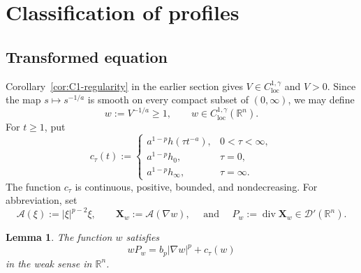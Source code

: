\documentclass[reqno,12pt]{amsart}
\numberwithin{equation}{section}
\newtheorem{lem}[thm]{Lemma}
\theoremstyle{remark}
\newcommand{\R}{\mathbb R}
\newcommand{\loc}{\mathrm{loc}}
\newcommand{\Acal}{\mathcal A}
\newcommand{\Xbf}{\mathbf X}
\begin{document}
\section{Classification of profiles}

\subsection{Transformed equation}\label{sec:classification-start}

Corollary~\ref{cor:C1-regularity} in the earlier section gives
$V\in C^{1,\gamma}_{\loc}$ and $V>0$.  Since the map $s\mapsto s^{-1/a}$ is smooth on every compact
subset of $(0,\infty)$, we may define
\begin{equation}\label{eq:defn-w}
w:=V^{-1/a}\ge1, \qquad w\in C^{1,\gamma}_{\loc}(\R^n).
\end{equation}
For $t\ge1$, put
\begin{equation}\label{eq:c-tau}
 c_\tau(t):=
 \begin{cases}
a^{1-p}h(\tau t^{-a}),&0<\tau<\infty,\\
a^{1-p}h_0,&\tau=0,\\
a^{1-p}h_\infty,&\tau=\infty.
 \end{cases}
\end{equation}
The function $c_\tau$ is continuous, positive, bounded, and nondecreasing.
For abbreviation, set
\begin{equation}\label{eq:defn-Pw}
\Acal(\xi):=|\xi|^{p-2}\xi,
\qquad \Xbf_w:=\Acal(\nabla w),
\quad \text{ and } \quad  P_w:=\operatorname{div}\Xbf_w\in\mathcal D'(\R^n).
\end{equation}

\begin{lem}
The function $w$ satisfies
\begin{equation}\label{eq:transformed-equation}
wP_w=b_p|\nabla w|^p+c_\tau(w)
\end{equation}
in the weak sense in $\R^n$.
\end{lem}
\end{document}
